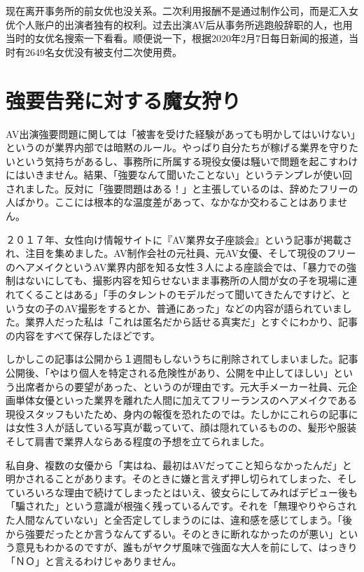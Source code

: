 \documentclass[12pt,UTF8]{ctexbook}
\begin{document}
现在离开事务所的前女优也没关系。二次利用报酬不是通过制作公司，而是汇入女优个人账户的出演者独有的权利。过去出演AV后从事务所逃跑般辞职的人，也用当时的女优名搜索一下看看。顺便说一下，根据2020年2月7日每日新闻的报道，当时有2649名女优没有被支付二次使用费。

\section{強要告発に対する魔女狩り}

AV出演強要問題に関しては「被害を受けた経験があっても明かしてはいけない」というのが業界内部では暗黙のルール。やっぱり自分たちが稼げる業界を守りたいという気持ちがあるし、事務所に所属する現役女優は騒いで問題を起こすわけにはいきません。結果、「強要なんて聞いたことない」というテンプレが使い回されました。反対に「強要問題はある！」と主張しているのは、辞めたフリーの人ばかり。ここには根本的な温度差があって、なかなか交わることはありません。

２０１７年、女性向け情報サイトに『AV業界女子座談会』という記事が掲載され、注目を集めました。AV制作会社の元社員、元AV女優、そして現役のフリーのヘアメイクというAV業界内部を知る女性３人による座談会では、「暴力での強制はないにしても、撮影内容を知らせないまま事務所の人間が女の子を現場に連れてくることはある」「手のタレントのモデルだって聞いてきたんですけど、という女の子のAV撮影をするとか、普通にあった」などの内容が語られていました。業界人だった私は「これは匿名だから話せる真実だ」とすぐにわかり、記事の内容をすべて保存したほどです。

しかしこの記事は公開から１週間もしないうちに削除されてしまいました。記事公開後、「やはり個人を特定される危険性があり、公開を中止してほしい」という出席者からの要望があった、というのが理由です。元大手メーカー社員、元企画単体女優といった業界を離れた人間に加えてフリーランスのヘアメイクである現役スタッフもいたため、身内の報復を恐れたのでは。たしかにこれらの記事には女性３人が話している写真が載っていて、顔は隠れているものの、髪形や服装そして肩書で業界人ならある程度の予想を立てられました。

私自身、複数の女優から「実はね、最初はAVだってこと知らなかったんだ」と明かされることがあります。そのときに嫌と言えず押し切られてしまった、そしていろいろな理由で続けてしまったとはいえ、彼女らにしてみればデビュー後も「騙された」という意識が根強く残っているんです。それを「無理やりやらされた人間なんていない」と全否定してしまうのには、違和感を感じてしまう。「後から強要だったとか言うなんてずるい。そのときに断れなかったのが悪い」という意見もわかるのですが、誰もがヤクザ風味で強面な大人を前にして、はっきり「ＮＯ」と言えるわけじゃありません。
\end{document}
